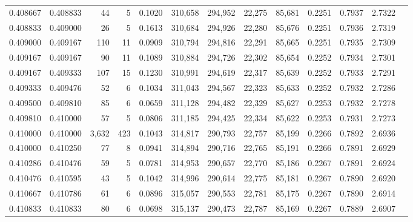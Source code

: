 \begin{tabular}{rrrrrrrrrrrrr}
0.408667 & 0.408833 &    44 &   5 &                                     0.1020 & 310,658 & 294,952 &  22,275 &  85,681 & 0.2251 & 0.7937 & 2.7322 \\
0.408833 & 0.409000 &    26 &   5 &                                     0.1613 & 310,684 & 294,926 &  22,280 &  85,676 & 0.2251 & 0.7936 & 2.7319 \\
0.409000 & 0.409167 &   110 &  11 &                                     0.0909 & 310,794 & 294,816 &  22,291 &  85,665 & 0.2251 & 0.7935 & 2.7309 \\
0.409167 & 0.409167 &    90 &  11 &                                     0.1089 & 310,884 & 294,726 &  22,302 &  85,654 & 0.2252 & 0.7934 & 2.7301 \\
0.409167 & 0.409333 &   107 &  15 &                                     0.1230 & 310,991 & 294,619 &  22,317 &  85,639 & 0.2252 & 0.7933 & 2.7291 \\
0.409333 & 0.409476 &    52 &   6 &                                     0.1034 & 311,043 & 294,567 &  22,323 &  85,633 & 0.2252 & 0.7932 & 2.7286 \\
0.409500 & 0.409810 &    85 &   6 &                                     0.0659 & 311,128 & 294,482 &  22,329 &  85,627 & 0.2253 & 0.7932 & 2.7278 \\
0.409810 & 0.410000 &    57 &   5 &                                     0.0806 & 311,185 & 294,425 &  22,334 &  85,622 & 0.2253 & 0.7931 & 2.7273 \\
0.410000 & 0.410000 & 3,632 & 423 &                                     0.1043 & 314,817 & 290,793 &  22,757 &  85,199 & 0.2266 & 0.7892 & 2.6936 \\
0.410000 & 0.410250 &    77 &   8 &                                     0.0941 & 314,894 & 290,716 &  22,765 &  85,191 & 0.2266 & 0.7891 & 2.6929 \\
0.410286 & 0.410476 &    59 &   5 &                                     0.0781 & 314,953 & 290,657 &  22,770 &  85,186 & 0.2267 & 0.7891 & 2.6924 \\
0.410476 & 0.410595 &    43 &   5 &                                     0.1042 & 314,996 & 290,614 &  22,775 &  85,181 & 0.2267 & 0.7890 & 2.6920 \\
0.410667 & 0.410786 &    61 &   6 &                                     0.0896 & 315,057 & 290,553 &  22,781 &  85,175 & 0.2267 & 0.7890 & 2.6914 \\
0.410833 & 0.410833 &    80 &   6 &                                     0.0698 & 315,137 & 290,473 &  22,787 &  85,169 & 0.2267 & 0.7889 & 2.6907 \\

\end{tabular}

